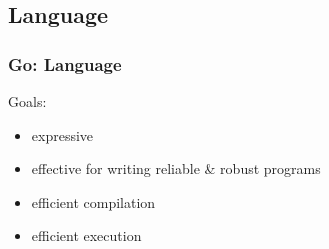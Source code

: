 \subsection{Language}

\begin{frame}[t]
  \frametitle{Go: Language}

  Goals:

  \begin{itemize}
  \item expressive
  \item effective for writing reliable \& robust programs
  \item efficient compilation
  \item efficient execution
  \end{itemize}
\end{frame}

